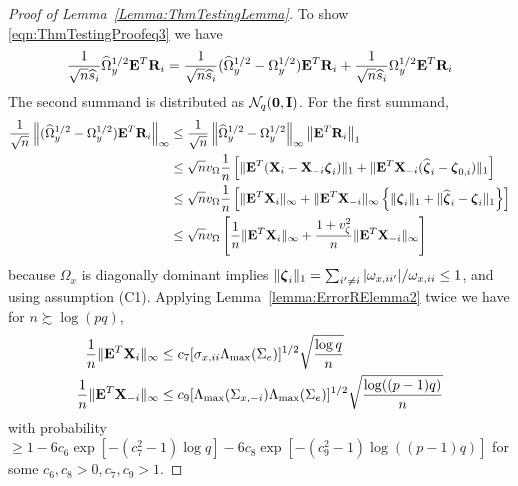 \documentclass[12pt, letterpaper]{article}
\theoremstyle{definition}
\numberwithin{equation}{section}
\begin{document}
\begin{proof}[Proof of Lemma~\ref{Lemma:ThmTestingLemma}]
To show \eqref{eqn:ThmTestingProofeq3} we have
%
\begin{align*}
\frac{1}{\sqrt n \widehat s_i}  \widehat \Omega_y^{1/2} {\mathbf{E}}^T {\mathbf{R}}_i =
\frac{1}{\sqrt n \widehat s_i}  (\widehat \Omega_y^{1/2} - \Omega_y^{1/2}) {\mathbf{E}}^T {\mathbf{R}}_i +
\frac{1}{\sqrt n \widehat s_i}  \Omega_y^{1/2} {\mathbf{E}}^T {\mathbf{R}}_i
\end{align*}
%
The second summand is distributed as ${\cal{N}}_q ({\bf 0}, {\mathbf{I}})$. For the first summand,
%
\begin{align}\label{eqn:ThmTestingProofeq31}
\frac{1}{\sqrt n}  \left\| (\widehat \Omega_y^{1/2} - \Omega_y^{1/2}) {\mathbf{E}}^T {\mathbf{R}}_i \right\|_\infty & \leq
\frac{1}{\sqrt n}  \left\| \widehat \Omega_y^{1/2} - \Omega_y^{1/2} \right\|_\infty  \left\| {\mathbf{E}}^T {\mathbf{R}}_i \right\|_1  \notag\\
& \leq \sqrt n v_\Omega \frac{1}{n} \left[ \| {\mathbf{E}}^T ({\mathbf{X}}_i -  {\mathbf{X}}_{-i} {\boldsymbol{\zeta}}_i ) \|_1 + \| {\mathbf{E}}^T {\mathbf{X}}_{-i} (\widehat {{\boldsymbol{\zeta}}}_i - {\boldsymbol{\zeta}}_{0,i} ) \|_1 \right] \notag\\
& \leq \sqrt n v_\Omega \frac{1}{n} \left[ \| {\mathbf{E}}^T {\mathbf{X}}_i \|_\infty + \| {\mathbf{E}}^T {\mathbf{X}}_{-i} \|_\infty
\left\{ \| {\boldsymbol{\zeta}}_i  \|_1 + \| \widehat {{\boldsymbol{\zeta}}}_i - {\boldsymbol{\zeta}}_i  \|_1 \right\} \right] \notag\\
& \leq \sqrt n v_\Omega \left[ \frac{1}{n} \| {\mathbf{E}}^T {\mathbf{X}}_i \|_\infty + 
\frac{1 + v_\zeta^2}{n} \| {\mathbf{E}}^T {\mathbf{X}}_{-i} \|_\infty \right]
\end{align}
%
because $\Omega_x$ is diagonally dominant implies $\| {\boldsymbol{\zeta}}_i \|_1 = \sum_{i' \neq i} |\omega_{x,ii'}|/ \omega_{x,ii} \leq 1$, and using assumption (C1). Applying Lemma~\ref{lemma:ErrorRElemma2} twice we have for $n \succsim \log(pq)$,
%
\begin{align}
\frac{1}{n} \| {\mathbf{E}}^T {\mathbf{X}}_i \|_\infty & \leq 
c_7 [ \sigma_{x,ii} \Lambda_{\max} (\Sigma_e) ]^{1/2} \sqrt{\frac{ \log q}{n}}\label{eqn:ThmTestingProofeq32}\\
\frac{1}{n} \| {\mathbf{E}}^T {\mathbf{X}}_{-i} \|_\infty  & \leq 
c_9 [ \Lambda_{\max} (\Sigma_{x,-i}) \Lambda_{\max} (\Sigma_e) ]^{1/2} \sqrt{\frac{ \log((p-1)q)}{n}}\label{eqn:ThmTestingProofeq33}
\end{align}
%
with probability $\geq 1 - 6c_6 \exp [-(c_7^2-1) \log q] - 6c_8 \exp [-(c_9^2-1) \log((p-1)q)]$ for some $c_6, c_8 >0, c_7, c_9 > 1$.


\end{proof}
\end{document}
